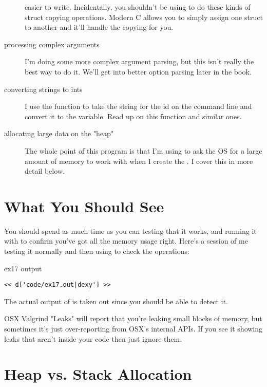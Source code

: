 \begin{description}
    easier to write.  Incidentally, you shouldn't be using  to do
    these kinds of struct copying operations. Modern C allows you to simply assign
    one struct to another and it'll handle the copying for you.
\item [processing complex arguments] I'm doing some more complex argument parsing,
    but this isn't really the best way to do it.  We'll get into better option
    parsing later in the book.
\item [converting strings to ints] I use the  function to take the
    string for the id on the command line and convert it to the 
    variable.  Read up on this function and similar ones.
\item [allocating large data on the "heap"] The whole point of this program is
    that I'm using  to ask the OS for a large amount of memory
    to work with when I create the .  I cover this in more
    detail below.
\end{description}


\section{What You Should See}

You should spend as much time as you can testing that it works, and running
it with  to confirm you've got all the memory usage
right.  Here's a session of me testing it normally and then using
 to check the operations:

\begin{code}{ex17 output}
\begin{lstlisting}
<< d['code/ex17.out|dexy'] >>
\end{lstlisting}
\end{code}

The actual output of  is taken out since you should
be able to detect it.

\begin{aside}{OSX Valgrind "Leaks"}
 will report that you're leaking small blocks of memory,
but sometimes it's just over-reporting from OSX's internal APIs.  If you see it
showing leaks that aren't inside your code then just ignore them.
\end{aside}

\section{Heap vs. Stack Allocation}

